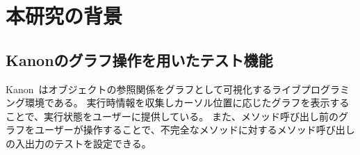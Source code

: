 \documentclass[11pt, a4paper, oneside, twocolumn]{jsarticle}
\begin{document}


\section{本研究の背景}


\subsection{Kanonのグラフ操作を用いたテスト機能}
\label{sec:test}
Kanon~\cite{kanon}はオブジェクトの参照関係をグラフとして可視化するライブプログラミング環境である。
実行時情報を収集しカーソル位置に応じたグラフを表示することで、実行状態をユーザーに提供している。
また、メソッド呼び出し前のグラフをユーザーが操作することで、不完全なメソッドに対するメソッド呼び出しの入出力のテストを設定できる。
\end{document}
